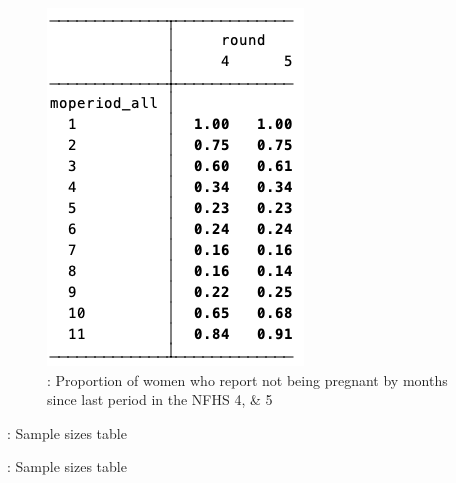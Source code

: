 \documentclass{article}
\begin{document}
\begin{figure}[H]
    \centering
    \includegraphics[width=\textwidth]{tables/says pregnant by gestational duration.png}
    \caption{: Proportion of women who report not being pregnant by months since last period in the NFHS 4, \& 5}
\end{figure}



\begin{table}[H]
    \centering
    \setlength{\tabcolsep}{4pt} %
    \footnotesize %
    \caption{: Sample sizes table}
    \label{tab:sumstat}
    \begin{adjustbox}{width=\textwidth}
        
    \end{adjustbox}
\end{table}


\begin{table}[H]
    \centering
    \setlength{\tabcolsep}{4pt} %
    \footnotesize %
    \caption{: Sample sizes table}
    \label{tab:sumstat}
    \begin{adjustbox}{width=\textwidth}
        
    \end{adjustbox}
\end{table}
\end{document}
